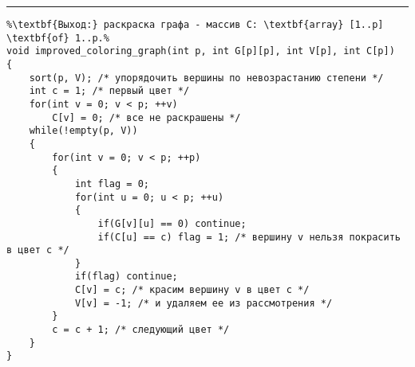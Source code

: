 \vspace{5pt} \hrule
\begin{lstlisting}[caption={Улучшенный алгоритм последовательного раскрашивания}, label=p360, escapechar=\%]
%\noindent\textbf{Вход:} граф G.\\%
%\textbf{Выход:} раскраска графа - массив C: \textbf{array} [1..p] \textbf{of} 1..p.%
void improved_coloring_graph(int p, int G[p][p], int V[p], int C[p])
{
	sort(p, V); /* упорядочить вершины по невозрастанию степени */
	int c = 1; /* первый цвет */
	for(int v = 0; v < p; ++v)
		C[v] = 0; /* все не раскрашены */
	while(!empty(p, V))
	{
		for(int v = 0; v < p; ++p)
		{
			int flag = 0;
			for(int u = 0; u < p; ++u)
			{
				if(G[v][u] == 0) continue;
				if(C[u] == c) flag = 1; /* вершину v нельзя покрасить в цвет c */
			}
			if(flag) continue;
			C[v] = c; /* красим вершину v в цвет c */
			V[v] = -1; /* и удаляем ее из рассмотрения */
		}
		c = c + 1; /* следующий цвет */
	}
}
\end{lstlisting}
